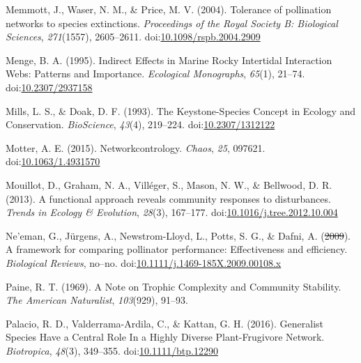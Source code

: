 \documentclass[a4paper]{artikel1}
\theoremstyle{definition}
\theoremstyle{definition}
\theoremstyle{definition}
\theoremstyle{remark}
\providecommand{\DIFaddtex}[1]{{\protect\color{blue}\uwave{#1}}} %
\providecommand{\DIFdeltex}[1]{{\protect\color{red}\sout{#1}}}                      %
\providecommand{\DIFaddbegin}{} %
\providecommand{\DIFaddend}{} %
\providecommand{\DIFdelbegin}{} %
\providecommand{\DIFdelend}{} %
\providecommand{\DIFadd}[1]{\texorpdfstring{\DIFaddtex{#1}}{#1}} %
\providecommand{\DIFdel}[1]{\texorpdfstring{\DIFdeltex{#1}}{}} %
\begin{document}
\hypertarget{ref-memmott_tolerance_2004}{}
Memmott, J., Waser, N. M., \& Price, M. V. (2004). Tolerance of
pollination networks to species extinctions. \emph{Proceedings of the
Royal Society B: Biological Sciences}, \emph{271}(1557), 2605--2611.
doi:\href{https://doi.org/10.1098/rspb.2004.2909}{10.1098/rspb.2004.2909}

\hypertarget{ref-menge_indirect_1995}{}
Menge, B. A. (1995). Indirect Effects in Marine Rocky Intertidal
Interaction Webs: Patterns and Importance. \emph{Ecological Monographs},
\emph{65}(1), 21--74.
doi:\href{https://doi.org/10.2307/2937158}{10.2307/2937158}

\hypertarget{ref-mills_keystone-species_1993}{}
Mills, L. S., \& Doak, D. F. (1993). The Keystone-Species Concept in
Ecology and Conservation. \emph{BioScience}, \emph{43}(4), 219--224.
doi:\href{https://doi.org/10.2307/1312122}{10.2307/1312122}

\hypertarget{ref-motter_networkcontrology_2015}{}
Motter, A. E. (2015). Networkcontrology. \emph{Chaos}, \emph{25},
097621. doi:\href{https://doi.org/10.1063/1.4931570}{10.1063/1.4931570}

\hypertarget{ref-mouillot_functional_2013}{}
Mouillot, D., Graham, N. A., Villéger, S., Mason, N. W., \& Bellwood, D.
R. (2013). A functional approach reveals community responses to
disturbances. \emph{Trends in Ecology \& Evolution}, \emph{28}(3),
167--177.
doi:\href{https://doi.org/10.1016/j.tree.2012.10.004}{10.1016/j.tree.2012.10.004}

\DIFdelbegin %
\DIFdelend \DIFaddbegin \hypertarget{ref-neeman_framework_2010}{}
\DIFaddend Ne'eman, G., Jürgens, A., Newstrom-Lloyd, L., Potts, S. G., \& Dafni, A.
(\DIFdelbegin \DIFdel{2009}\DIFdelend \DIFaddbegin \DIFadd{2010}\DIFaddend ). A framework for comparing pollinator performance: Effectiveness
and efficiency. \emph{Biological Reviews}, no--no.
doi:\href{https://doi.org/10.1111/j.1469-185X.2009.00108.x}{10.1111/j.1469-185X.2009.00108.x}

\hypertarget{ref-paine_note_1969}{}
Paine, R. T. (1969). A Note on Trophic Complexity and Community
Stability. \emph{The American Naturalist}, \emph{103}(929), 91--93.

\hypertarget{ref-palacio_generalist_2016}{}
Palacio, R. D., Valderrama-Ardila, C., \& Kattan, G. H. (2016).
Generalist Species Have a Central Role In a Highly Diverse
Plant-Frugivore Network. \emph{Biotropica}, \emph{48}(3), 349--355.
doi:\href{https://doi.org/10.1111/btp.12290}{10.1111/btp.12290}
\end{document}
